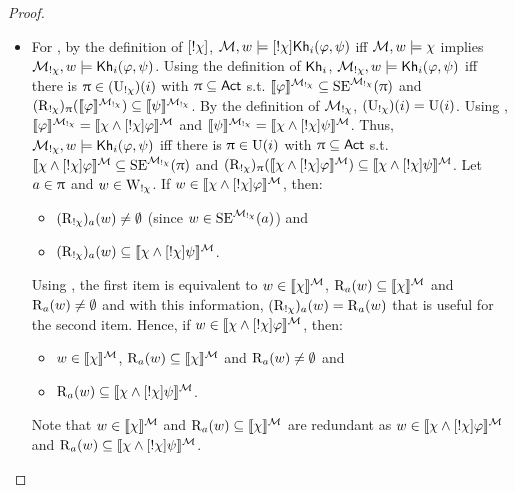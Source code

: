\begin{proof}
\begin{itemize}
\item For , by the definition of $[!\chi]$, $\mathcal{M},w \models [!\chi]{\sf Kh}_i(\varphi,\psi)$ iff $\mathcal{M},w \models \chi$ implies $\mathcal{M}_{!\chi},w \models {\sf Kh}_i(\varphi,\psi)$. Using the definition of ${\sf Kh}_i$, $\mathcal{M}_{!\chi},w \models {\sf Kh}_i(\varphi,\psi)$ iff there is $\uppi \in (\operatorname{U}_{!\chi})(i)$ with $\uppi \subseteq {\rm \sf Act}$ s.t. $\llbracket \varphi \rrbracket^{\mathcal{M}_{!\chi}} \subseteq \operatorname{SE}^{\mathcal{M}_{!\chi}}(\uppi)$ and $(\operatorname{R}_{!\chi})_\uppi(\llbracket \varphi \rrbracket^{\mathcal{M}_{!\chi}}) \subseteq \llbracket \psi \rrbracket^{\mathcal{M}_{!\chi}}$.
By the definition of $\mathcal{M}_{!\chi}$, $(\operatorname{U}_{!\chi})(i)=\operatorname{U}(i)$. Using , $\llbracket \varphi \rrbracket^{\mathcal{M}_{!\chi}} = \llbracket \chi \wedge [!\chi]\varphi \rrbracket^{\mathcal{M}}$ and $\llbracket \psi \rrbracket^{\mathcal{M}_{!\chi}} = \llbracket \chi \wedge [!\chi]\psi \rrbracket^{\mathcal{M}}$.
Thus, $\mathcal{M}_{!\chi},w \models {\sf Kh}_i(\varphi,\psi)$ iff there is $\uppi \in \operatorname{U}(i)$ with $\uppi \subseteq {\rm \sf Act}$ s.t. $\llbracket \chi \wedge [!\chi]\varphi \rrbracket^{\mathcal{M}} \subseteq \operatorname{SE}^{\mathcal{M}_{!\chi}}(\uppi)$ and $(\operatorname{R}_{!\chi})_\uppi(\llbracket \chi \wedge [!\chi]\varphi \rrbracket^{\mathcal{M}}) \subseteq \llbracket \chi \wedge [!\chi]\psi \rrbracket^{\mathcal{M}}$.
Let $a \in \uppi$ and $w \in \operatorname{W}_{!\chi}$. If $w \in \llbracket \chi \wedge [!\chi]\varphi \rrbracket^{\mathcal{M}}$, then:
\begin{itemize}
    \item $(\operatorname{R}_{!\chi})_a(w) \neq \emptyset$ (since $w \in \operatorname{SE}^{\mathcal{M}_{!\chi}}(a)$) and
    \item $(\operatorname{R}_{!\chi})_a(w) \subseteq \llbracket \chi \wedge [!\chi]\psi \rrbracket^{\mathcal{M}}$.
\end{itemize}
Using , the first item is equivalent to $w \in \llbracket \chi \rrbracket^{\mathcal{M}}$, $\operatorname{R}_a(w) \subseteq \llbracket \chi \rrbracket^{\mathcal{M}}$ and $\operatorname{R}_a(w) \neq \emptyset$ and with this information, $(\operatorname{R}_{!\chi})_a(w) = \operatorname{R}_a(w)$ that is useful for the second item.
Hence, if $w \in \llbracket \chi \wedge [!\chi]\varphi \rrbracket^{\mathcal{M}}$, then:
\begin{itemize}
    \item $w \in \llbracket \chi \rrbracket^{\mathcal{M}}$, $\operatorname{R}_a(w) \subseteq \llbracket \chi \rrbracket^{\mathcal{M}}$ and $\operatorname{R}_a(w) \neq \emptyset$ and
    \item $\operatorname{R}_a(w) \subseteq \llbracket \chi \wedge [!\chi]\psi \rrbracket^{\mathcal{M}}$.
\end{itemize}
Note that $w \in \llbracket \chi \rrbracket^{\mathcal{M}}$ and $\operatorname{R}_a(w) \subseteq \llbracket \chi \rrbracket^{\mathcal{M}}$ are redundant as $w \in \llbracket \chi \wedge [!\chi]\varphi \rrbracket^{\mathcal{M}}$ and $\operatorname{R}_a(w) \subseteq \llbracket \chi \wedge [!\chi]\psi \rrbracket^{\mathcal{M}}$.

\end{itemize}
\end{proof}

